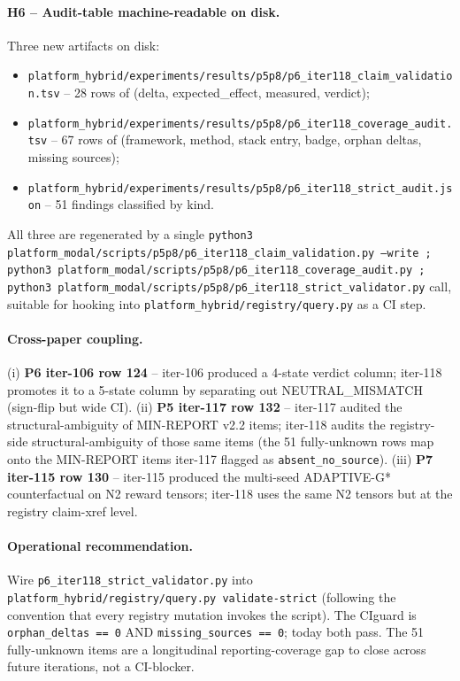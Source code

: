 \documentclass{article}
\begin{document}
\paragraph{H6 -- Audit-table machine-readable on disk.}
Three new artifacts on disk:
\begin{itemize}
\item \texttt{platform_hybrid/experiments/results/p5p8/p6\_iter118\_claim\_validation.tsv}
      -- 28 rows of (delta, expected\_effect, measured, verdict);
\item \texttt{platform_hybrid/experiments/results/p5p8/p6\_iter118\_coverage\_audit.tsv}
      -- 67 rows of (framework, method, stack entry, badge, orphan deltas,
      missing sources);
\item \texttt{platform_hybrid/experiments/results/p5p8/p6\_iter118\_strict\_audit.json}
      -- 51 findings classified by kind.
\end{itemize}
All three are regenerated by a single
\texttt{python3 platform_modal/scripts/p5p8/p6\_iter118\_claim\_validation.py --write ;
python3 platform_modal/scripts/p5p8/p6\_iter118\_coverage\_audit.py ;
python3 platform_modal/scripts/p5p8/p6\_iter118\_strict\_validator.py} call, suitable for
hooking into \texttt{platform_hybrid/registry/query.py} as a CI step.

\paragraph{Cross-paper coupling.}
(i) \textbf{P6 iter-106 row 124} -- iter-106 produced a 4-state verdict
column; iter-118 promotes it to a 5-state column by separating out
NEUTRAL\_MISMATCH (sign-flip but wide CI). (ii) \textbf{P5 iter-117 row
132} -- iter-117 audited the structural-ambiguity of MIN-REPORT v2.2 items;
iter-118 audits the registry-side structural-ambiguity of those same
items (the 51 fully-unknown rows map onto the MIN-REPORT items iter-117
flagged as \texttt{absent\_no\_source}). (iii) \textbf{P7 iter-115 row 130}
-- iter-115 produced the multi-seed ADAPTIVE-G* counterfactual on N2
reward tensors; iter-118 uses the same N2 tensors but at the registry
claim-xref level.

\paragraph{Operational recommendation.}
Wire \texttt{p6\_iter118\_strict\_validator.py} into
\texttt{platform_hybrid/registry/query.py validate-strict} (following the convention that
every registry mutation invokes the script). The CIguard is
\texttt{orphan\_deltas == 0} AND \texttt{missing\_sources == 0}; today
both pass. The 51 fully-unknown items are a longitudinal reporting-coverage
gap to close across future iterations, not a CI-blocker.
 
\end{document}
